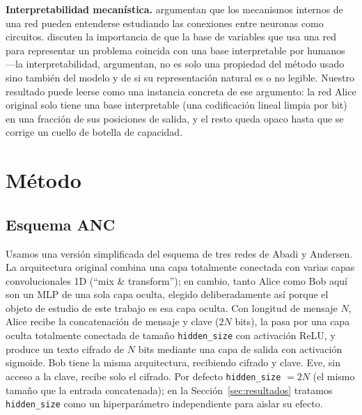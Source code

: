 \documentclass[manuscript,screen]{acmart}
\begin{document}
\textbf{Interpretabilidad mecanística.} \citet{olah2020zoom} argumentan que los mecanismos
internos de una red pueden entenderse estudiando las conexiones entre neuronas como circuitos.
\citet{olah2022mechanistic} discuten la importancia de que la base de variables que usa una red
para representar un problema coincida con una base interpretable por humanos —la
interpretabilidad, argumentan, no es solo una propiedad del método usado sino también del
modelo y de si su representación natural es o no legible. Nuestro resultado puede leerse como
una instancia concreta de ese argumento: la red Alice original solo tiene una base
interpretable (una codificación lineal limpia por bit) en una fracción de sus posiciones de
salida, y el resto queda opaco hasta que se corrige un cuello de botella de capacidad.

\section{Método}
\label{sec:metodo}

\subsection{Esquema ANC}

Usamos una versión simplificada del esquema de tres redes de Abadi y Andersen. La arquitectura
original combina una capa totalmente conectada con varias capas convolucionales 1D
(``mix \& transform''); en cambio, tanto Alice como Bob aquí son un MLP de una sola capa
oculta, elegido deliberadamente así porque el objeto de estudio de este trabajo es esa capa
oculta. Con longitud de mensaje $N$, Alice recibe la concatenación de mensaje y clave ($2N$
bits), la pasa por una capa oculta totalmente conectada de tamaño \texttt{hidden\_size} con
activación ReLU, y produce un texto cifrado de $N$ bits mediante una capa de salida con
activación sigmoide. Bob tiene la misma arquitectura, recibiendo cifrado y clave. Eve, sin
acceso a la clave, recibe solo el cifrado. Por defecto \texttt{hidden\_size} $= 2N$ (el mismo
tamaño que la entrada concatenada); en la Sección~\ref{sec:resultados} tratamos
\texttt{hidden\_size} como un hiperparámetro independiente para aislar su efecto.
\end{document}
